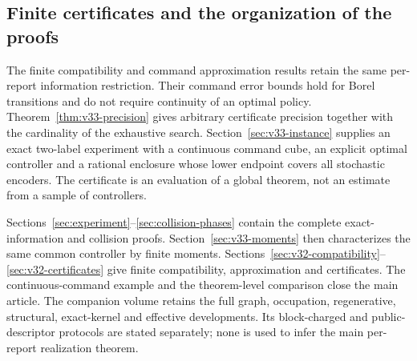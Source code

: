 \subsection{Finite certificates and the organization of the proofs}
The finite compatibility and command approximation results retain the
same per-report information restriction. Their command error bounds
hold for Borel transitions and do not require continuity of an optimal
policy. Theorem~\ref{thm:v33-precision} gives arbitrary certificate
precision together with the cardinality of the exhaustive search.
Section~\ref{sec:v33-instance} supplies an exact two-label experiment
with a continuous command cube, an explicit optimal controller and a
rational enclosure whose lower endpoint covers all stochastic encoders.
The certificate is an evaluation of a global theorem, not an estimate
from a sample of controllers.

Sections~\ref{sec:experiment}--\ref{sec:collision-phases} contain the
complete exact-information and collision proofs. Section~\ref{sec:v33-moments}
then characterizes the same common controller by finite moments.
Sections~\ref{sec:v32-compatibility}--\ref{sec:v32-certificates}
give finite compatibility, approximation and certificates. The
continuous-command example and the theorem-level comparison close the
main article. The companion volume retains the full graph, occupation,
regenerative, structural, exact-kernel and effective developments.
Its block-charged and public-descriptor protocols are stated separately;
none is used to infer the main per-report realization theorem.
